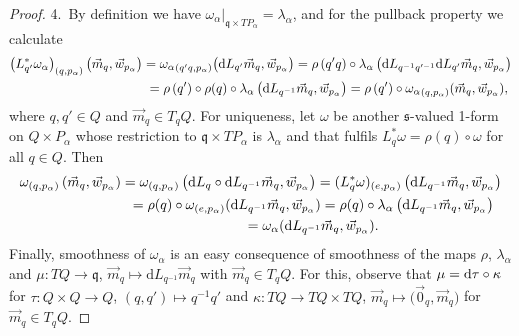 \documentclass[pdftex]{sigma}
\numberwithin{equation}{section}
\begin{document}
\begin{proof}
4.~By def\/inition we have $\omega_\alpha|_{\mathfrak{q}\times TP_\alpha}=\lambda_\alpha$, and for the pullback property we
calculate
\begin{gather*}
\left(L_{q'}^{*}\omega_\alpha\right)_{(q,p_\alpha)}\big(\vec{m}_q,\vec{w}_{p_\alpha}\big)
={\omega_\alpha}_{(q'q,p_\alpha)}\big(\mathrm{d}
L_{q'}\vec{m}_q,\vec{w}_{p_\alpha}\big)
=\rho\left(q'q\right)\circ\lambda_\alpha\left(\mathrm{d} L_{q^{-1}q'^{-1}}\mathrm{d}
L_{q'}\vec{m}_q,\vec{w}_{p_\alpha}\right)
\\
\hphantom{\left(L_{q'}^{*}\omega_\alpha\right)_{(q,p_\alpha)}\big(\vec{m}_q,\vec{w}_{p_\alpha}\big)}{}
=\rho\left(q'\right)\circ\rho(q)\circ \lambda_\alpha\left(\mathrm{d}
L_{q^{-1}}\vec{m}_q,\vec{w}_{p_\alpha}\right)
=\rho\left(q'\right)\circ {\omega_\alpha}_{(q,p_\alpha)}(\vec{m}_q,\vec{w}_{p_\alpha}),
\end{gather*}
where $q,q'\in Q$ and $\vec{m}_q\in T_qQ$.
For uniqueness, let $\omega$ be another $\mathfrak{s}$-valued 1-form on $Q\times P_\alpha$ whose restriction to
$\mathfrak{q}\times TP_\alpha$ is $\lambda_\alpha$ and that fulf\/ils $L_q^{*}\omega=\rho(q)\circ \omega$ for all $q\in Q$.
Then
\begin{gather*}
\omega_{(q,p_\alpha)}\left(\vec{m}_q,\vec{w}_{p_\alpha}\right)={\omega}_{(q,p_\alpha)}\left(\mathrm{d} L_q\circ
\mathrm{d} L_{q^{-1}}\vec{m}_q,\vec{w}_{p_\alpha}\right) =(L_q^{*}\omega)_{(e,p_\alpha)}\left(\mathrm{d}
L_{q^{-1}}\vec{m}_q,\vec{w}_{p_\alpha}\right)
\\
\hphantom{\omega_{(q,p_\alpha)}\left(\vec{m}_q,\vec{w}_{p_\alpha}\right)}{}
=\rho(q)\circ \omega_{(e,p_\alpha)}(\mathrm{d} L_{q^{-1}}\vec{m}_q,\vec{w}_{p_\alpha}) = \rho(q)\circ
\lambda_\alpha\left(\mathrm{d} L_{q^{-1}}\vec{m}_q,\vec{w}_{p_\alpha}\right)
\\
\hphantom{\omega_{(q,p_\alpha)}\left(\vec{m}_q,\vec{w}_{p_\alpha}\right)}{}
=\omega_\alpha(\mathrm{d} L_{q^{-1}}\vec{m}_q,\vec{w}_{p_\alpha}).
\end{gather*}
Finally, smoothness of $\omega_\alpha$ is an easy consequence of smoothness of the maps $\rho$, $\lambda_\alpha$ and
$\mu \colon TQ\rightarrow \mathfrak{q}$, $\vec{m}_q \mapsto \mathrm{d} L_{q^{-1}}\vec{m}_q$ with $\vec{m}_q\in T_qQ$.
For this, observe that $\mu={\rm d}\tau \circ \kappa$ for $\tau\colon Q\times Q\rightarrow Q$, $(q,q')\mapsto q^{-1}q'$ and
$\kappa\colon TQ\rightarrow TQ\times TQ$, $\vec{m}_q\mapsto \big(\vec{0}_q,\vec{m}_q\big)$ for $\vec{m}_q\in T_qQ$.
\end{proof}
\end{document}
